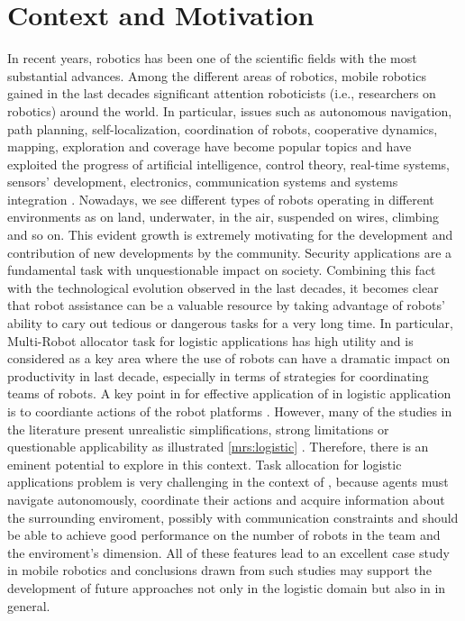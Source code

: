 \section{Context and Motivation}
In recent years, robotics has been one of the scientific fields with the most substantial
advances. Among the different areas of robotics, mobile robotics gained in the last decades 
significant attention roboticists (i.e., researchers on robotics)
around the world. In particular, issues such as autonomous navigation, path planning,
self-localization, coordination of robots, cooperative dynamics, mapping, exploration 
and coverage have become popular topics and have exploited the progress
of artificial intelligence, control theory, real-time systems, sensors’ development,
electronics, communication systems and systems integration \cite{parker}.
\newline
Nowadays, we see different types of robots operating in
different environments as on land, underwater, in the air, suspended on wires,
climbing and so on. This evident growth is extremely motivating for the development
 and contribution of new developments by the community.
\newline
Security applications are a fundamental task with unquestionable impact on
society. Combining this fact with the technological evolution observed in the last
decades, it becomes clear that robot assistance can be a valuable resource by
taking advantage of robots’ ability to cary out tedious or dangerous tasks for a very long time.
In particular, Multi-Robot allocator task for logistic applications
has high utility and is considered as a key area where the use of robots can have a 
dramatic impact on productivity in last decade, especially in terms of strategies for coordinating
teams of robots. 
A key point in for effective application of \mrs in logistic application is to coordiante 
actions of the robot platforms \cite{maxsum}.
However, many of the studies in the literature present unrealistic
simplifications, strong limitations or questionable applicability as illustrated \ref{mrs:logistic} . Therefore, there is an eminent potential to explore in this context.
\newline
Task allocation for logistic applications problem is very challenging
in the context of \mrs, because agents must navigate autonomously,
coordinate their actions and acquire information
about the surrounding enviroment, possibly with communication constraints and should be able to achieve good performance 
on the number of robots in the team and the enviroment's dimension.
All of these features lead to an excellent case study in mobile robotics
and conclusions drawn from such studies may support the development of future
approaches not only in the logistic domain but also in \mrs in
general.

